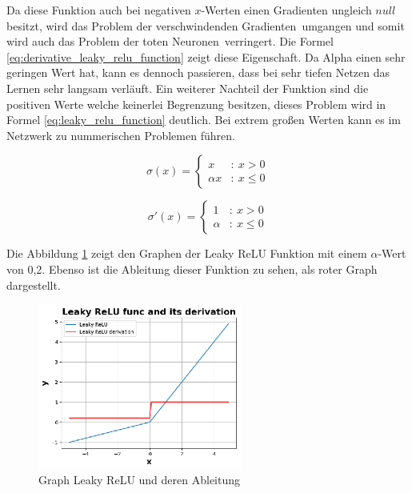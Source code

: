 Da diese Funktion auch bei negativen $x$-Werten einen Gradienten ungleich $null$ besitzt, wird das \glqq Problem der verschwindenden Gradienten\grqq \ umgangen und somit wird auch das Problem der \glqq toten Neuronen\grqq \ verringert. Die Formel \ref{eq:derivative_leaky_relu_function} zeigt diese Eigenschaft. Da Alpha einen sehr geringen Wert hat, kann es dennoch passieren, dass bei sehr tiefen Netzen das Lernen sehr langsam verläuft. Ein weiterer Nachteil der Funktion sind die positiven Werte welche keinerlei Begrenzung besitzen, dieses Problem wird in Formel \ref{eq:leaky_relu_function} deutlich. Bei extrem großen Werten kann es im Netzwerk zu nummerischen Problemen führen.

\begin{equation}\label{eq:leaky_relu_function}
	\sigma (x) = \left\{
	\begin{array}{cl}
		x & : \ x > 0 \\
		\alpha x & : \ x \leq 0
	\end{array}
	\right.
\end{equation}

\begin{equation}\label{eq:derivative_leaky_relu_function}
	\sigma' (x) = \left\{
	\begin{array}{cl}
		1 & : \ x > 0 \\
		\alpha & : \ x \leq 0
	\end{array}
	\right.
\end{equation}

Die Abbildung \ref{img:leaky_relu_func_graph} zeigt den Graphen der Leaky ReLU Funktion mit einem $\alpha$-Wert von 0,2. Ebenso ist die Ableitung dieser Funktion zu sehen, als roter Graph dargestellt.

\begin{figure}[!ht]
	\includegraphics[width=0.6\textwidth]{content/chapter_basics/plots/leaky_relu_func_plot.eps}
	\centering
	\caption{Graph Leaky ReLU und deren Ableitung}
	\label{img:leaky_relu_func_graph}
\end{figure}

